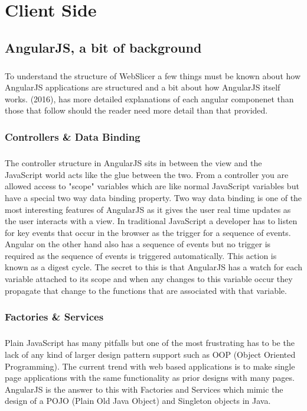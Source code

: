 \chapter{Client Side}

\section{AngularJS, a bit of background}
\paragraph{}
To understand the structure of WebSlicer a few things must be known about how AngularJS applications are structured and a bit about how AngularJS itself works.
\cite{meding-2016} (2016), has more detailed explanations of each angular componenet than those that follow should the reader need more detail than that provided.

\subsection{Controllers \& Data Binding}
\paragraph{}
The controller structure in AngularJS sits in between the view and the JavaScript world acts like the glue between the two.
From a controller you are allowed access to "scope" variables which are like normal JavaScript variables but have a special two way data binding property.
Two way data binding is one of the most interesting features of AngularJS as it gives the user real time updates as the user interacts with a view.
In traditional JavaScript a developer has to listen for key events that occur in the browser as the trigger for a sequence of events.
Angular on the other hand also has a sequence of events but no trigger is required as the sequence of events is triggered automatically.
This action is known as a digest cycle.
The secret to this is that AngularJS has a watch for each variable attached to its scope and when any changes to this variable occur they propagate that change to the functions that are associated with that variable.

\subsection{Factories \& Services}
\paragraph{}
Plain JavaScript has many pitfalls but one of the most frustrating has to be the lack of any kind of larger design pattern support such as OOP (Object Oriented Programming).
The current trend with web based applications is to make single page applications with the same functionality as prior designs with many pages.
AngularJS is the answer to this with Factories and Services which mimic the design of a POJO (Plain Old Java Object) and Singleton objects in Java.

